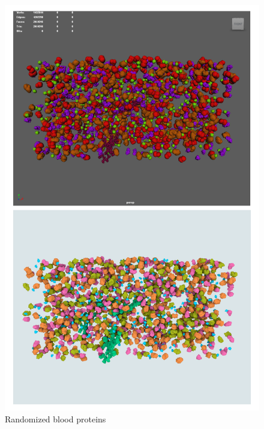 \documentclass[
  digital, %
  table,   %
  nolof,     %
  nolot,     %
  oneside,
]{fithesis3}
\begin{document}
\begin{figure}
  \centering
  \includegraphics[scale=0.4]{images/demonstration/blood-big.png}
  \caption{Randomized blood proteins}
  \label{fig:blood-random}
\end{figure}
\end{document}
